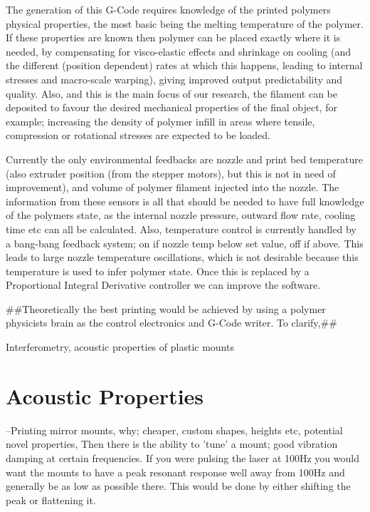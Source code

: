 \documentclass{article}
\begin{document}
The generation of this G-Code requires knowledge of the printed polymers
physical properties, the most basic being the melting temperature of the
polymer. If these properties are known then polymer can be placed exactly
where it is needed, by compensating for visco-elastic effects and shrinkage on
cooling (and the different (position dependent) rates at which this happens,
leading to internal stresses and macro-scale warping), giving improved output
predictability and quality. Also, and this is the main focus of our research,
the filament can be deposited to favour the desired mechanical properties of
the final object, for example; increasing the density of polymer infill in
areas where tensile, compression or rotational stresses are expected to be
loaded.

Currently the only environmental feedbacks are nozzle and print bed
temperature (also extruder position (from the stepper motors), but this is not
in need of improvement), and volume of polymer filament injected into the
nozzle. The information from these sensors is all that should be needed to
have full knowledge of the polymers state, as the internal nozzle pressure,
outward flow rate, cooling time etc can all be calculated. Also, temperature
control is currently handled by a bang-bang feedback system; on if nozzle temp
below set value, off if above. This leads to large nozzle temperature
oscillations, which is not desirable because this temperature is used to infer
polymer state. Once this is replaced by a Proportional Integral Derivative
controller we can improve the software.

\#\#Theoretically the best printing would be achieved by using a polymer
physicists brain as the control electronics and G-Code writer. To clarify,\#\#

Interferometry, acoustic properties of plastic mounts

\section{Acoustic Properties}

--Printing mirror mounts, why; cheaper, custom shapes, heights etc, potential
novel properties, Then there is the ability to 'tune' a mount; good vibration
damping at certain frequencies. If you were pulsing the laser at 100Hz you
would want the mounts to have a peak resonant response well away from 100Hz
and generally be as low as possible there. This would be done by either
shifting the peak or flattening it.
\end{document}
